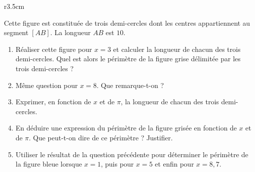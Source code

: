 
\begin{exercice}\label{exosmath-0810}

\begin{wrapfigure}[4]{r}{3.5cm}
   \vspace{-0.5cm}        %
   \centering
   
\end{wrapfigure}

Cette figure est constituée de trois demi-cercles dont les centres appartiennent au segment $[AB]$. La longueur \( AB\) est \( 10\).

\begin{enumerate}
    \item
Réaliser cette figure pour $x = 3$ et calculer la longueur de chacun des trois demi-cercles. Quel est alors le périmètre de la figure grise délimitée par les trois demi-cercles ?
\item
 Même question pour $x = 8$.  Que remarque-t-on ?
\item
 Exprimer, en fonction de $x$ et de \( \pi\), la longueur de chacun des trois demi-cercles.
\item
 En déduire une expression du périmètre de la figure grisée en fonction de $x$ et de \( \pi\).  Que peut-t-on dire de ce périmètre ? Justifier.
\item
 Utiliser le résultat de la question précédente pour déterminer le périmètre de la figure bleue lorsque $x = 1$, puis pour $x = 5$ et enfin pour $x = 8,7$.
\end{enumerate}

\end{exercice}
